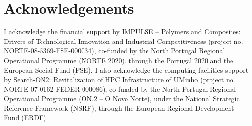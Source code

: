 
\chapter*{Acknowledgements}

I acknowledge the financial support by IMPULSE -- Polymers and Composites: Drivers of Technological Innovation and Industrial Competitiveness (project no.  NORTE-08-5369-FSE-000034), co-funded by the North Portugal Regional Operational Programme (NORTE 2020), through the Portugal 2020 and the European Social Fund (FSE).
I also acknowledge the computing facilities support by Search-ON2: Revitalization of HPC Infrastructure of UMinho (project no. NORTE-07-0162-FEDER-000086), co-funded by the North Portugal Regional Operational Programme (ON.2 -- O Novo Norte), under the National Strategic Reference Framework (NSRF), through the European Regional Development Fund (ERDF).


